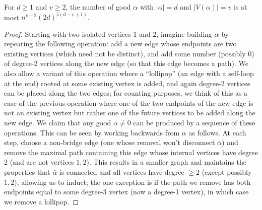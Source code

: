 \documentclass[11pt]{article}
\begin{document}
\begin{lemma}\label{lem:number:good:graphs:2}
For $d \ge 1$ and $v \ge 2$, the number of good $\alpha$ with $|\alpha|=d$ and $|V(\alpha)|=v$ is at most $n^{v-2}(2d)^{5(d-v+1)}$.
\end{lemma}

\begin{proof}
Starting with two isolated vertices $1$ and $2$, imagine building $\alpha$ by repeating the following operation: add a new edge whose endpoints are two existing vertices (which need not be distinct), and add some number (possibly 0) of degree-2 vertices along the new edge (so that this edge becomes a path). We also allow a variant of this operation where a ``lollipop'' (an edge with a self-loop at the end) rooted at some existing vertex is added, and again degree-2 vertices can be placed along the two edges; for counting purposes, we think of this as a case of the previous operation where one of the two endpoints of the new edge is not an existing vertex but rather one of the future vertices to be added along the new edge. We claim that any good $\alpha \ne 0$ can be produced by a sequence of these operations. This can be seen by working backwards from $\alpha$ as follows. At each step, choose a non-bridge edge (one whose removal won't disconnect $\bar\alpha$) and remove the maximal path containing this edge whose internal vertices have degree 2 (and are not vertices $1,2$). This results in a smaller graph and maintains the properties that $\bar\alpha$ is connected and all vertices have degree $\ge 2$ (except possibly $1,2$), allowing us to induct; the one exception is if the path we remove has both endpoints equal to some degree-3 vertex (now a degree-1 vertex), in which case we remove a lollipop.


\end{proof}
\end{document}
